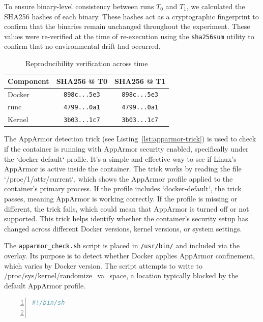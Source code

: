\documentclass[12pt]{report}
\begin{document}
\begin{doublespace}
To ensure binary-level consistency between runs \texttt{\( T_0 \)} and \texttt{\( T_1 \)}, we calculated the SHA256 hashes of each binary. These hashes act as a cryptographic fingerprint to confirm that the binaries remain unchanged throughout the experiment. These values were re-verified at the time of re-execution using the \texttt{sha256sum} utility to confirm that no environmental drift had occurred.

\begin{table}[H]
\centering
\caption{Reproducibility verification across time}
\begin{tabular}{|l|c|c|}
\hline
\textbf{Component} & \textbf{SHA256 @ T0} & \textbf{SHA256 @ T1} \\
\hline
Docker & \texttt{898c...5e3} & \texttt{898c...5e3} \\
runc & \texttt{4799...0a1} & \texttt{4799...0a1} \\
Kernel & \texttt{3b03...1c7} & \texttt{3b03...1c7} \\
\hline
\end{tabular}
\end{table}


The AppArmor detection trick (see Listing~\ref{lst:apparmor-trick}) is used to check if the container is running with AppArmor security enabled, specifically under the `docker-default` profile. It’s a simple and effective way to see if Linux’s AppArmor is active inside the container. The trick works by reading the file `/proc/1/attr/current`, which shows the AppArmor profile applied to the container’s primary process. If the profile includes `docker-default`, the trick passes, meaning AppArmor is working correctly. If the profile is missing or different, the trick fails, which could mean that AppArmor is turned off or not supported. This trick helps identify whether the container's security setup has changed across different Docker versions, kernel versions, or system settings.

The \texttt{apparmor\_check.sh} script is placed in \texttt{/usr/bin/} and included via the overlay. Its purpose is to detect whether Docker applies AppArmor confinement, which varies by Docker version. The script attempts to write to /proc/sys/kernel/randomize\_va\_space, a location typically blocked by the default AppArmor profile.

\begin{lstlisting}[language=bash, caption={AppArmor Enforcement Trick Script}, label={lst:apparmor-trick}, numbers=left, numberstyle=\tiny, stepnumber=1, breaklines=true, frame=single, backgroundcolor=\color{gray!10}, basicstyle=\ttfamily\footnotesize, showspaces=false, showstringspaces=false]
#!/bin/sh


\end{lstlisting}
\end{doublespace}
\end{document}
